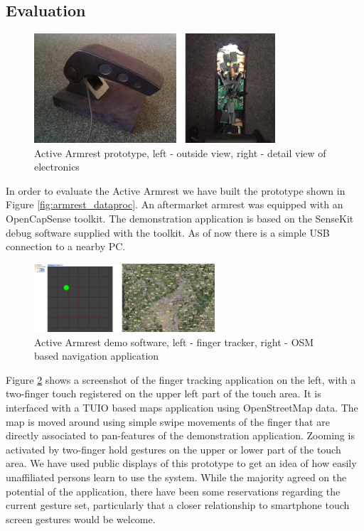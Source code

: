 \subsection{Evaluation}
\begin{figure}[h]
\centering
\includegraphics[width=0.8\textwidth]{images/armrest_proto}
\caption{Active Armrest prototype, left - outside view, right - detail view of electronics}
\label{fig:armrest_proto}
\end{figure}
In order to evaluate the Active Armrest we have built the prototype shown in Figure \ref{fig:armrest_dataproc}. An aftermarket armrest was equipped with an OpenCapSense toolkit. The demonstration application is based on the SenseKit debug software supplied with the toolkit. As of now there is a simple USB connection to a nearby PC.
\begin{figure}[h]
\centering
\includegraphics[width=0.6\textwidth]{images/armrest_eval}
\caption{Active Armrest demo software, left - finger tracker, right - OSM based navigation application}
\label{fig:armrest_eval}
\end{figure}
Figure \ref{fig:armrest_eval} shows a screenshot of the finger tracking application on the left, with a two-finger touch registered on the upper left part of the touch area. It is interfaced with a TUIO \cite{kaltenbrunner2005tuio} based maps application using OpenStreetMap \cite{haklay2008openstreetmap} data. The map is moved around using simple swipe movements of the finger that are directly associated to pan-features of the demonstration application. Zooming is activated by two-finger hold gestures on the upper or lower part of the touch area. We have used public displays of this prototype to get an idea of how easily unaffiliated persons learn to use the system. While the majority agreed on the potential of the application, there have been some reservations regarding the current gesture set, particularly that a closer relationship to smartphone touch screen gestures would be welcome.
